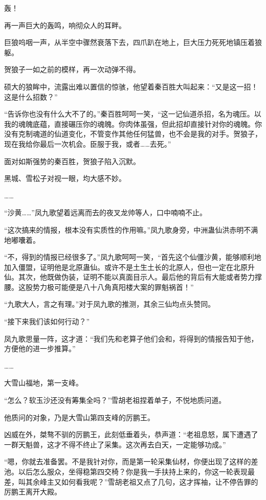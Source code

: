 \begin{this_body}
轰！

再一声巨大的轰鸣，响彻众人的耳畔。

巨狼呜咽一声，从半空中骤然衰落下去，四爪趴在地上，巨大压力死死地镇压着狼躯。

贺狼子一如之前的模样，再一次动弹不得。

硕大的狼眸中，流露出难以置信的惊骇，他望着秦百胜大叫起来：“又是这一招！这是什么招数？”

“告诉你也没有什么大不了的。”秦百胜呵呵一笑，“这一记仙道杀招，名为魂压。以我的魂魄底蕴，直接碾压你的魂魄。你肉体虽强，但此招却直接针对你的魂魄。你没有克制魂道的仙道变化，不管变作其他任何猛兽，也不会是我的对手。贺狼子，现在我给你最后一次机会。臣服于我，或者……去死。”

面对如斯强势的秦百胜，贺狼子陷入沉默。

黑城、雪松子对视一眼，均大感不妙。

……

“沙黄……”凤九歌望着远离而去的夜叉龙帅等人，口中喃喃不止。

“这次搞来的情报，根本没有实质性的作用嘛。”凤九歌身旁，中洲蛊仙洪赤明不满地嘟囔着。

“不，得到的情报已经很多了。”凤九歌呵呵一笑，“首先这个仙僵沙黄，能够顺利地加入僵盟，证明他是北原蛊仙。或许不是土生土长的北原人，但也一定在北原升仙。其次，他既做伪装，证明不能以真面目示人。最后他的背后有大能或者势力撑腰。这股势力极可能便是八十八角真阳楼大案的罪魁祸首！”

“九歌大人，言之有理。”对于凤九歌的推测，其余三仙均点头赞同。

“接下来我们该如何行动？”

凤九歌思量一阵，这才道：“我们先和老算子他们会和，将得到的情报告知于他，方便他的进一步推算。”

……

大雪山福地，第一支峰。

“怎么？软玉沙还没有筹集全吗？”雪胡老祖捏着单子，不悦地质问道。

他质问的对象，乃是大雪山第四支峰的厉鹏王。

凶威在外，桀骜不驯的厉鹏王，此刻低垂着头，恭声道：“老祖息怒，属下遭遇了一群天魁兽，这才不得不终止了采集。这次再去白天，一定能够功成。”

“嗯，你就去准备罢。不是我针对你，而是第一轮采集仙材，你便出现了这样的差池。以后怎么服众，坐得稳第四交椅？你是我一手扶持上来的，你这一轮表现最差，叫其余峰主又如何看我呢？”雪胡老祖又点了几句，这才挥袖，让不停告罪的厉鹏王离开大殿。


\end{this_body}
